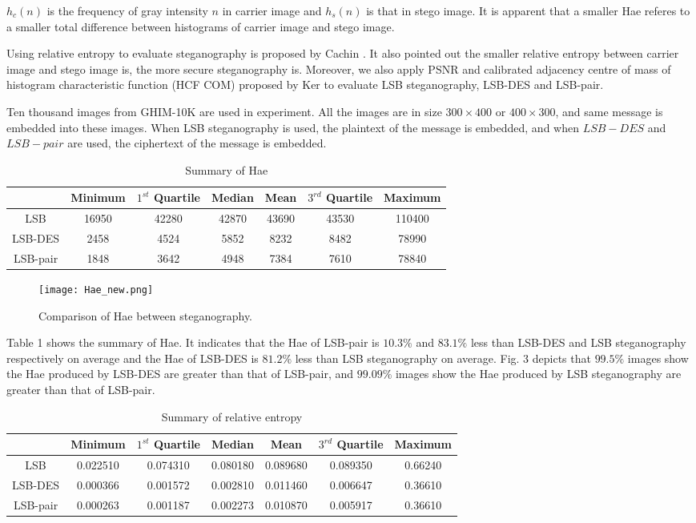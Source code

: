 \documentclass[a4paper,10pt,twocolumn]{article}
\begin{document}
$h_c(n)$ is the frequency of gray intensity $n$ in carrier image and $h_s(n)$ is that in
stego image. It is apparent that a smaller Hae referes to a smaller total difference between
histograms of carrier image and stego image.

Using relative entropy to evaluate steganography is proposed by Cachin \cite{c6}. It also pointed out
the smaller relative entropy between carrier image and stego image is, the more secure steganography is.
Moreover, we also apply PSNR and calibrated adjacency centre of mass of histogram characteristic
function (HCF COM) proposed by Ker \cite{c7} to evaluate LSB steganography, LSB-DES and LSB-pair.

Ten thousand images from GHIM-10K \cite{c8} are used in experiment. All the images are in size $300 \times 400$
or $400 \times 300$, and same message is embedded into these images. When LSB steganography is used,
the plaintext of the message is embedded, and when $LSB-DES$ and $LSB-pair$ are used, the ciphertext
of the message is embedded.

\begin{table*}
\begin{tabular}{|c|c|c|c|c|c|c|}
\hline
 & Minimum & $1^{st}$ Quartile & Median & Mean & $3^{rd}$ Quartile & Maximum \\
\hline
LSB & 16950 & 42280 & 42870 & 43690 & 43530 & 110400 \\
LSB-DES & 2458 & 4524 & 5852 & 8232 & 8482 & 78990 \\
LSB-pair & 1848 & 3642 & 4948 & 7384 & 7610 & 78840 \\
\hline
\end{tabular}
 \caption{Summary of Hae}
\end{table*}


\begin{figure}
 \texttt{[image: Hae\_new.png]}
 \caption{Comparison of Hae between steganography.}
\end{figure}


Table 1 shows the summary of Hae. It indicates that the Hae of LSB-pair is $10.3\%$ and $83.1\%$ less
than LSB-DES and LSB steganography respectively on average and the Hae of LSB-DES is $81.2\%$ less
than LSB steganography on average. Fig. 3 depicts that $99.5\%$ images show the Hae produced by LSB-DES
are greater than that of LSB-pair, and $99.09\%$ images show the Hae produced by LSB steganography
are greater than that of LSB-pair.

\begin{table*}
\begin{tabular}{|c|c|c|c|c|c|c|}
\hline
 & Minimum & $1^{st}$ Quartile & Median & Mean & $3^{rd}$ Quartile & Maximum \\
 \hline
 LSB & 0.022510 & 0.074310 & 0.080180 & 0.089680 & 0.089350 & 0.66240 \\
 LSB-DES & 0.000366 & 0.001572 & 0.002810 & 0.011460 & 0.006647 & 0.36610 \\
 LSB-pair & 0.000263 & 0.001187 & 0.002273 & 0.010870 & 0.005917 & 0.36610 \\
 \hline
\end{tabular}
 \caption{Summary of relative entropy}
\end{table*}
\end{document}
